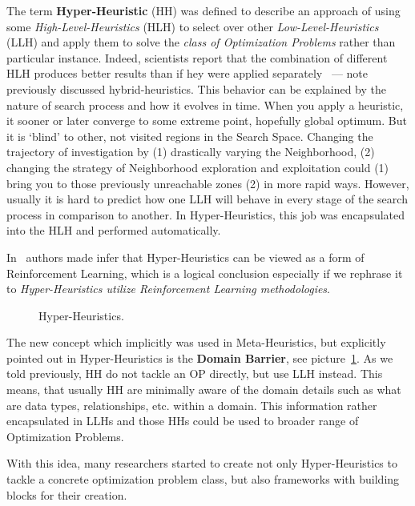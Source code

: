 The term \textbf{Hyper-Heuristic} (HH) was defined to describe an approach of using some \textit{High-Level-Heuristics} (HLH) to select over other \textit{Low-Level-Heuristics} (LLH) and apply them to solve the \textit{class of Optimization Problems} rather than particular instance. Indeed, scientists report that the combination of different HLH produces better results than if hey were applied separately~\cite{drake2019recent} — note previously discussed hybrid-heuristics.
This behavior can be explained by the nature of search process and how it evolves in time. When you apply a heuristic, it sooner or later converge to some extreme point, hopefully global optimum. But it is `blind' to other, not visited regions in the Search Space. Changing the trajectory of investigation by (1) drastically varying the Neighborhood, (2) changing the strategy of Neighborhood exploration and exploitation could (1) bring you to those previously unreachable zones (2) in more rapid ways. However, usually it is hard to predict how one LLH will behave in every stage of the search process in comparison to another. In Hyper-Heuristics, this job was encapsulated into the HLH and performed automatically. 

In~\cite{moriarty1999evolutionary} authors made infer that Hyper-Heuristics can be viewed as a form of Reinforcement Learning, which is a logical conclusion especially if we rephrase it to \textit{Hyper-Heuristics utilize Reinforcement Learning methodologies}.

\begin{figure}
	\centering
	
	\caption[Hyper-Heuristics]{Hyper-Heuristics.}
	\label{bg:pic:HH}
\end{figure}

The new concept which implicitly was used in Meta-Heuristics, but explicitly pointed out in Hyper-Heuristics is the \textbf{Domain Barrier}, see picture~\ref{bg:pic:HH}.
As we told previously, HH do not tackle an OP directly, but use LLH instead. This means, that usually HH are minimally aware of the domain details such as what are data types, relationships, etc. within a domain. This information rather encapsulated in LLHs and those HHs could be used to broader range of Optimization Problems.

With this idea, many researchers started to create not only Hyper-Heuristics to tackle a concrete optimization problem class, but also frameworks with building blocks for their creation.


